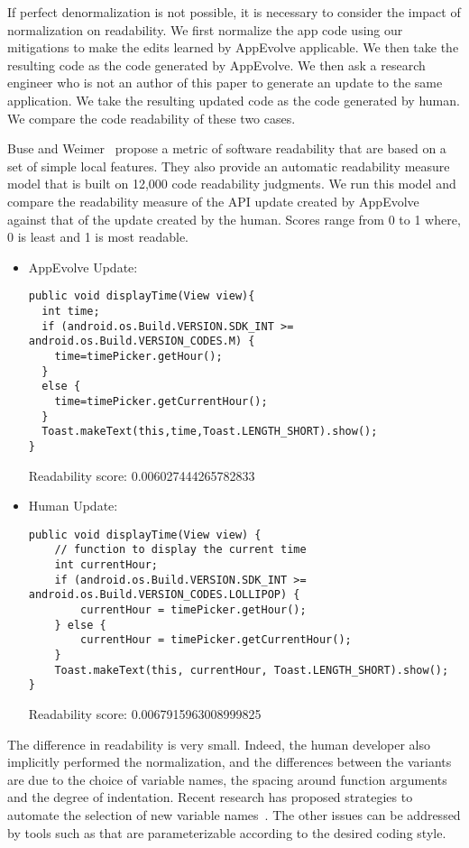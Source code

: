 If perfect denormalization is not possible, it is necessary to consider the
impact of normalization on readability. We first normalize the app code
using our mitigations to make the edits learned by AppEvolve applicable. We
then take the resulting code as the code generated by AppEvolve. We then
ask a research engineer who is not an author of this paper to generate an
update to the same application. We take the resulting updated code as the
code generated by human. We compare the code readability of these two cases.

Buse and Weimer~\cite{Buse:2008:MSR:1390630.1390647} propose a metric of
software readability that are based on a set of simple local features. They
also provide an automatic readability measure model that is built on 12,000
code readability judgments. We run this model and compare the readability
measure of the API update created by AppEvolve against that of the update
created by the human.  Scores range from 0 to 1 where, 0 is least and 1 is
most readable.


\begin{itemize}
\item AppEvolve Update:
\begin{lstlisting}[language=text,numbers=none]
public void displayTime(View view){
  int time;
  if (android.os.Build.VERSION.SDK_INT >= android.os.Build.VERSION_CODES.M) {
    time=timePicker.getHour();
  }
  else {
    time=timePicker.getCurrentHour();
  }
  Toast.makeText(this,time,Toast.LENGTH_SHORT).show();
}
\end{lstlisting}
Readability score: 0.006027444265782833


\item Human Update:
\begin{lstlisting}[language=text,numbers=none]
public void displayTime(View view) {
    // function to display the current time
    int currentHour;
    if (android.os.Build.VERSION.SDK_INT >= android.os.Build.VERSION_CODES.LOLLIPOP) {
        currentHour = timePicker.getHour();
    } else {
        currentHour = timePicker.getCurrentHour();
    }
    Toast.makeText(this, currentHour, Toast.LENGTH_SHORT).show();
}
\end{lstlisting}
Readability score: 0.0067915963008999825
\end{itemize}

The difference in readability is very small. Indeed, the human developer
also implicitly performed the normalization, and the differences between
the variants are due to the choice of variable names, the spacing around
function arguments and the degree of indentation.  Recent research has
proposed strategies to automate the selection of new variable
names~\cite{...}.  The other issues can be addressed by tools such as
 that are
parameterizable according to the desired coding style.
